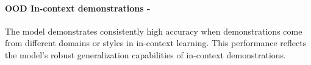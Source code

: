 \paragraph{OOD In-context demonstrations - \low}
The model demonstrates consistently high accuracy when demonstrations come from different domains or styles in in-context learning. This performance reflects the model's robust generalization capabilities of in-context demonstrations.